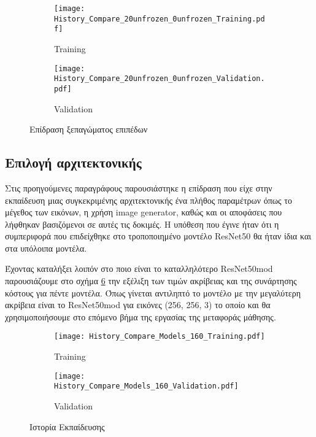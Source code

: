 \begin{figure}[H]
\centering
\begin{subfigure}[t]{0.49\textwidth}
\texttt{[image: History\_Compare\_20unfrozen\_0unfrozen\_Training.pdf]}
\caption{Training}
\label{image_unfrozen20_training}
\end{subfigure}
\begin{subfigure}[t]{0.49\textwidth}
\texttt{[image: History\_Compare\_20unfrozen\_0unfrozen\_Validation.pdf]}
\caption{Validation}
\label{image_unfrozen0_validation}
\end{subfigure}
\caption{Επίδραση ξεπαγώματος επιπέδων}
\label{Unfreeze_Layers_fig}
\end{figure}

\subsection{Επιλογή αρχιτεκτονικής}
\label{Architecture Selection}
Στις προηγούμενες παραγράφους παρουσιάστηκε η επίδραση που είχε στην εκπαίδευση μιας συγκεκριμένης αρχιτεκτονικής ένα πλήθος παραμέτρων όπως το μέγεθος των εικόνων, η χρήση image generator, καθώς και οι αποφάσεις που λήφθηκαν βασιζόμενοι σε αυτές τις δοκιμές. Η υπόθεση που έγινε ήταν ότι η συμπεριφορά που επιδείχθηκε στο τροποποιημένο μοντέλο ResNet50 θα ήταν ίδια και στα υπόλοιπα μοντέλα.

Έχοντας καταλήξει λοιπόν στο ποιο είναι το καταλληλότερο ResNet50mod παρουσιάζουμε στο σχήμα \ref{Training_History_Train} την εξέλιξη των τιμών ακρίβειας και της συνάρτησης κόστους για πέντε μοντέλα. Όπως γίνεται αντιληπτό το μοντέλο με την μεγαλύτερη ακρίβεια είναι το ResNet50mod για εικόνες (256, 256, 3) το οποίο και θα χρησιμοποιήσουμε στο επόμενο βήμα της εργασίας της μεταφοράς μάθησης. 



\begin{figure}[H]
\centering
\begin{subfigure}[t]{1.0\textwidth}
\texttt{[image: History\_Compare\_Models\_160\_Training.pdf]}
\caption{Training}
\label{image_unfrozen20_training}
\end{subfigure}
\begin{subfigure}[t]{1.0\textwidth}
\texttt{[image: History\_Compare\_Models\_160\_Validation.pdf]}
\caption{Validation}
\label{image_unfrozen0_validation}
\end{subfigure}
\caption{Ιστορία Εκπαίδευσης}
\label{Training_History_Train}
\end{figure}